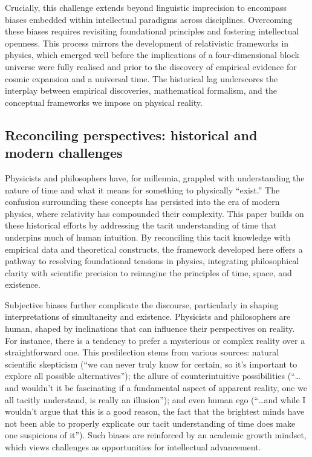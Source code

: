 \documentclass[aps,rmp,groupedaddress,twocolumn,10pt]{revtex4-2}
\begin{document}
Crucially, this challenge extends beyond linguistic imprecision to encompass biases embedded within intellectual paradigms across disciplines. Overcoming these biases requires revisiting foundational principles and fostering intellectual openness. This process mirrors the development of relativistic frameworks in physics, which emerged well before the implications of a four-dimensional block universe were fully realised \cite{Rietdijk1966,Putnam1967} and prior to the discovery of empirical evidence for cosmic expansion and a universal time. The historical lag underscores the interplay between empirical discoveries, mathematical formalism, and the conceptual frameworks we impose on physical reality.

\subsection{Reconciling perspectives: historical and modern challenges}

Physicists and philosophers have, for millennia, grappled with understanding the nature of time and what it means for something to physically ``exist.'' The confusion surrounding these concepts has persisted into the era of modern physics, where relativity has compounded their complexity. This paper builds on these historical efforts by addressing the tacit understanding of time that underpins much of human intuition. By reconciling this tacit knowledge with empirical data and theoretical constructs, the framework developed here offers a pathway to resolving foundational tensions in physics, integrating philosophical clarity with scientific precision to reimagine the principles of time, space, and existence.

Subjective biases further complicate the discourse, particularly in shaping interpretations of simultaneity and existence. Physicists and philosophers are human, shaped by inclinations that can influence their perspectives on reality. For instance, there is a tendency to prefer a mysterious or complex reality over a straightforward one. This predilection stems from various sources: natural scientific skepticism (``we can never truly know for certain, so it's important to explore all possible alternatives''); the allure of counterintuitive possibilities (``\ldots and wouldn't it be fascinating if a fundamental aspect of apparent reality, one we all tacitly understand, is really an illusion''); and even human ego (``\ldots and while I wouldn't argue that this is a good reason, the fact that the brightest minds have not been able to properly explicate our tacit understanding of time does make one suspicious of it''). Such biases are reinforced by an academic growth mindset, which views challenges as opportunities for intellectual advancement.
\end{document}
